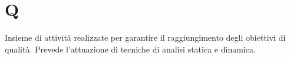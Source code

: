 
\section{Q}

Insieme di attività realizzate per garantire il raggiungimento degli obiettivi di qualità. Prevede l'attuazione di tecniche di analisi statica e dinamica.

